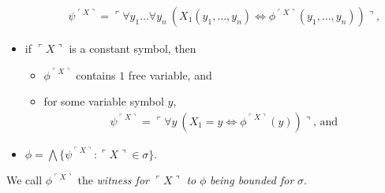 \documentclass[12pt]{article}
\numberwithin{equation}{section}
\begin{document}
\begin{defi}
\begin{itemize}
\begin{itemize}[label=$\circ$, leftmargin=20pt]
\begin{align*}
            \psi^{\ulcorner X \urcorner} = \ulcorner \forall y_1 \dots \forall y_n \ (X_1(y_1, \dots, y_n) \iff \phi^{\ulcorner X \urcorner}(y_1, \dots, y_n)) \urcorner \text{,}
        \end{align*}
    \end{itemize}
    \item if $\ulcorner X \urcorner$ is a constant symbol, then 
    \begin{itemize}[label=$\circ$, leftmargin=20pt]
        \item $\phi^{\ulcorner X \urcorner}$ contains $1$ free variable, and
        \item for some variable symbol $y$,
        \begin{align*}
            \psi^{\ulcorner X \urcorner} = \ulcorner \forall y \ (X_1 = y \iff \phi^{\ulcorner X \urcorner}(y)) \urcorner \text{, and}
        \end{align*}
    \end{itemize}
    \item $\phi = \bigwedge \{\psi^{\ulcorner X \urcorner} : \ulcorner X \urcorner \in \sigma\}$.
\end{itemize}
We call $\phi^{\ulcorner X \urcorner}$ the \emph{witness for} $\ulcorner X \urcorner$ \emph{to} $\phi$ \emph{being bounded for} $\sigma$.
\end{defi}
\end{document}
